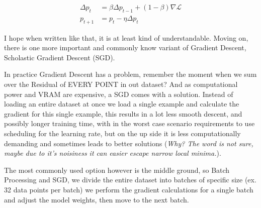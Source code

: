 \documentclass{article}
\begin{document}
\begin{align*}
    \Delta p_t &= \beta \Delta p_{t-1} + (1-\beta)\nabla\mathcal L\\
    p_{t+1} &= p_t - \eta\Delta p_t
\end{align*}

I hope when written like that, it is at least kind of understandable. Moving on, there is one more important and commonly know variant of Gradient Descent, Scholastic Gradient Descent (SGD).

In practice Gradient Descent has a problem, remember the moment when we sum over the Residual of EVERY POINT in out dataset? And as computational power and VRAM are expensive, a SGD comes with a solution. Instead of loading an entire dataset at once we load a single example and calculate the gradient for this single example, this results in a lot less smooth descent, and possibly longer training time, with in the worst case scenario requirements to use scheduling for the learning rate, but on the up side it is less computationally demanding and sometimes leads to better solutions (\textit{Why? The word is not sure, maybe due to it's noisiness it can easier escape narrow local minima.}).

The most commonly used option however is the middle ground, so Batch Processing and SGD, we divide the entire dataset into batches of specific size (ex. 32 data points per batch) we perform the gradient calculations for a single batch and adjust the model weights, then move to the next batch.
\end{document}

